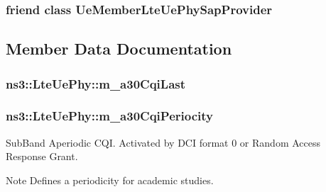\subsubsection[{\texorpdfstring{Ue\+Member\+Lte\+Ue\+Phy\+Sap\+Provider}{UeMemberLteUePhySapProvider}}]{\setlength{\rightskip}{0pt plus 5cm}friend class {\bf Ue\+Member\+Lte\+Ue\+Phy\+Sap\+Provider}\hspace{0.3cm}{\ttfamily [friend]}}\hypertarget{classns3_1_1LteUePhy_aaca526d8c133dd03f28c821350d16d42}{}\label{classns3_1_1LteUePhy_aaca526d8c133dd03f28c821350d16d42}


\subsection{Member Data Documentation}
\subsubsection[{\texorpdfstring{m\+\_\+a30\+Cqi\+Last}{m_a30CqiLast}}]{ ns3\+::\+Lte\+Ue\+Phy\+::m\+\_\+a30\+Cqi\+Last\hspace{0.3cm}{\ttfamily [private]}}\hypertarget{classns3_1_1LteUePhy_a912b9e3767497522b16d68e3602ec0a3}{}\label{classns3_1_1LteUePhy_a912b9e3767497522b16d68e3602ec0a3}
\subsubsection[{\texorpdfstring{m\+\_\+a30\+Cqi\+Periocity}{m_a30CqiPeriocity}}]{ ns3\+::\+Lte\+Ue\+Phy\+::m\+\_\+a30\+Cqi\+Periocity\hspace{0.3cm}{\ttfamily [private]}}\hypertarget{classns3_1_1LteUePhy_a154d2c8025b353d563bf4ed40045536f}{}\label{classns3_1_1LteUePhy_a154d2c8025b353d563bf4ed40045536f}
Sub\+Band Aperiodic C\+QI. Activated by D\+CI format 0 or Random Access Response Grant. \begin{DoxyNote}{Note}
Defines a periodicity for academic studies. 
\end{DoxyNote}
